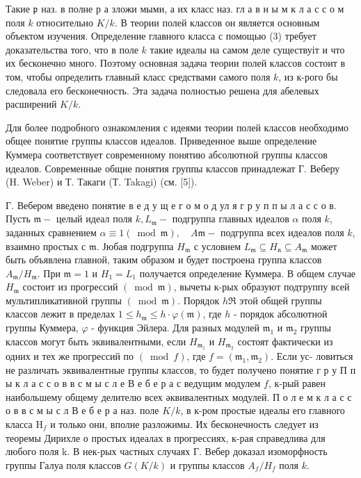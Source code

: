 \documentclass[10pt]{article}
\begin{document}
Такие $\mathfrak{p}$ наз. в полне р а зложи мыми, а их класс наз. гл а в н ы м к л а с с о м поля $k$ относительно $K / k$. В теории полей классов он является основным объектом изучения. Определение главного класса с помощью (3) требует доказательства того, что в поле $k$ такие идеалы на самом деле существуіт и что их бесконечно много. Поэтому основная задача теории полей классов состоит в том, чтобы определить главный класс средствами самого поля $k$, из к-рого бы следовала его бесконечность. Эта задача полностью решена для абелевых расширений $K / k$.



Для более подробного ознакомления с идеями теории полей классов необходимо общее понятие группы классов идеалов. Приведенное выше определение Куммера соответствует современному понятию абсолютной группы классов идеалов. Современные общие понятия группы классов принадлежат Г. Веберу (H. Weber) и Т. Такаги (Т. Takagi) (см. [5]).



Г. Вебером введено понятие в е д у щ е г о м о д ул я г р у п п ы л а с с о в. Пусть $\mathfrak{m}-$ целый идеал поля $k, L_{\mathfrak{m}}-$ подгруппа главных идеалов $\alpha$ поля $k$, заданных сравнением $\alpha \equiv 1(\bmod \mathfrak{m}), \quad A \mathfrak{m}-$ подгруппа всех идеалов поля $k$, взаимно простых с $\mathfrak{m}$. Јюбая подгруппа $H_{\mathfrak{m}}$ с условием $L_{\mathfrak{m}} \subseteq H_{\mathfrak{n}} \subseteq A_{\mathfrak{m}}$ может быть объявлена главной, таким образом и будет построена группа классов $A_{\mathfrak{m}} / H_{\mathfrak{m}}$. При $\mathfrak{m}=1$ и $H_{1}=L_{1}$ получается определение Куммера. В общем случае $H_{\mathfrak{m}}$ состоит из прогрессий $(\bmod \mathfrak{m})$, вычеты к-рых образуют подтруппу всей мультипликативной группы $(\bmod \mathfrak{m})$. Порядок $h \Re$ этой общей группы классов лежит в пределах $1 \leqslant h_{\mathfrak{m}} \leqslant h \cdot \varphi(\mathfrak{m})$, где $h$ - порядок абсолютной группы Куммера, $\varphi$ - функция Эйлера. Для разных модулей $\mathfrak{m}_{1}$ и $\mathfrak{m}_{2}$ группы классов могут быть эквивалентными, если $H_{\mathfrak{m}_{1}}$ и $H_{\mathfrak{m}_{2}}$ состоят фактически из одних и тех же прогрессий по $(\bmod f)$, где $f=\left(\mathfrak{m}_{1}, \mathfrak{m}_{2}\right)$. Если ус- ловиться не различать эквивалентные группы классов, то будет получено понятие г р у П п ы к л а с с о в в с м ы с л е В е б е р а с ведущим модулем $f$, к-рый равен наибольшему общему делителю всех әквивалентных модулей. П о л е м к л а с с о в в с м ы с л В е б е р а наз. поле $K / k$, в к-ром простые идеалы его главного класса $\mathrm{H}_{f}$ и только они, вполне разложимы. Их бесконечность следует из теоремы Дирихле о простых идеалах в прогрессиях, к-рая справедлива для любого поля k. В нек-рых частных случаях Г. Вебер доказал изоморфность группы Галуа поля классов $G(K / k)$ и группы классов $A_{f} / H_{f}$ поля $k$.
\end{document}
